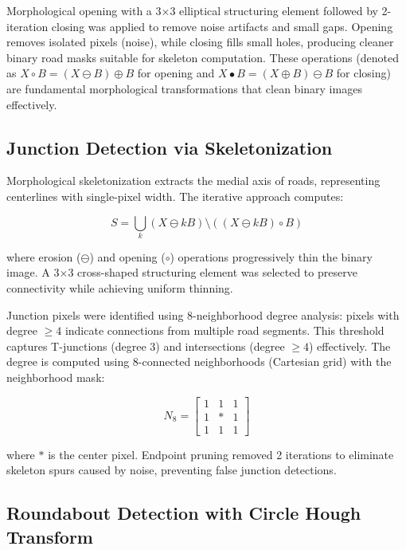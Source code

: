 \documentclass[conference]{IEEEtran}
\begin{document}
Morphological opening with a 3$\times$3 elliptical structuring element followed by 2-iteration closing was applied to remove noise artifacts and small gaps. Opening removes isolated pixels (noise), while closing fills small holes, producing cleaner binary road masks suitable for skeleton computation. These operations (denoted as $X \circ B = (X \ominus B) \oplus B$ for opening and $X \bullet B = (X \oplus B) \ominus B$ for closing) are fundamental morphological transformations that clean binary images effectively.

\subsection{Junction Detection via Skeletonization}

Morphological skeletonization extracts the medial axis of roads, representing centerlines with single-pixel width. The iterative approach computes:

\begin{equation}
S = \bigcup_k (X \ominus kB) \setminus ((X \ominus kB) \circ B)
\end{equation}

where erosion ($\ominus$) and opening ($\circ$) operations progressively thin the binary image. A 3$\times$3 cross-shaped structuring element was selected to preserve connectivity while achieving uniform thinning.

Junction pixels were identified using 8-neighborhood degree analysis: pixels with degree $\geq 4$ indicate connections from multiple road segments. This threshold captures T-junctions (degree 3) and intersections (degree $\geq 4$) effectively. The degree is computed using 8-connected neighborhoods (Cartesian grid) with the neighborhood mask:

\begin{equation}
N_8 = \begin{bmatrix}
1 & 1 & 1 \\
1 & * & 1 \\
1 & 1 & 1
\end{bmatrix}
\end{equation}

where $*$ is the center pixel. Endpoint pruning removed 2 iterations to eliminate skeleton spurs caused by noise, preventing false junction detections.

\subsection{Roundabout Detection with Circle Hough Transform}
\end{document}
